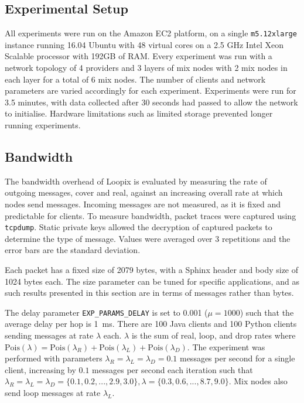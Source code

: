 \documentclass[final,dissertation.tex]{subfiles}
\begin{document}
\subsection{Experimental Setup}

All experiments were run on the Amazon EC2 platform, on a single \verb|m5.12xlarge| instance running 16.04 Ubuntu with 48 virtual cores on a 2.5 GHz Intel Xeon Scalable processor with 192GB of RAM. Every experiment was run with a network topology of 4 providers and 3 layers of mix nodes with 2 mix nodes in each layer for a total of 6 mix nodes. The number of clients and network parameters are varied accordingly for each experiment. Experiments were run for 3.5 minutes, with data collected after 30 seconds had passed to allow the network to initialise. Hardware limitations such as limited storage prevented longer running experiments.

\subsection{Bandwidth}
 
The bandwidth overhead of Loopix is evaluated by measuring the rate of outgoing messages, cover and real, against an increasing overall rate at which nodes send messages. Incoming messages are not measured, as it is fixed and predictable for clients. To measure bandwidth, packet traces were captured using \verb|tcpdump|. Static private keys allowed the decryption of captured packets to determine the type of message. Values were averaged over 3 repetitions and the error bars are the standard deviation.

Each packet has a fixed size of 2079 bytes, with a Sphinx header and body size of 1024 bytes each. The size parameter can be tuned for specific applications, and as such results presented in this section are in terms of messages rather than bytes.

The delay parameter \verb|EXP_PARAMS_DELAY| is set to 0.001 ($\mu = 1000$) such that the average delay per hop is \SI{1}{\milli\second}. There are 100 Java clients and 100 Python clients sending messages at rate $\lambda$ each. $\lambda$ is the sum of real, loop, and drop rates where $\text{Pois}(\lambda) = \text{Pois}(\lambda_R) + \text{Pois}(\lambda_L) + \text{Pois}(\lambda_D)$. The experiment was performed with parameters $\lambda_R = \lambda_L = \lambda_D = 0.1$ messages per second for a single client, increasing by $0.1$ messages per second each iteration such that $\lambda_R = \lambda_L = \lambda_D = \{0.1, 0.2, ..., 2.9, 3.0\}, \lambda = \{0.3, 0.6, ..., 8.7, 9.0\}$. Mix nodes also send loop messages at rate $\lambda_L$.
\end{document}
